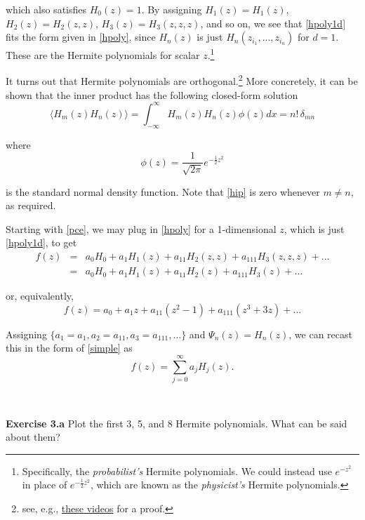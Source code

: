 \documentclass[11pt]{article}
\numberwithin{equation}{section}
\begin{document}
which also satisfies $H_0(z) = 1$. By assigning $H_1(z) = H_1(z)$, $H_2(z) = H_2(z, z)$, $H_3(z) = H_3(z, z, z)$, and so on, we see that \eqref{hpoly1d} fits the form given in \eqref{hpoly}, since $H_n(z)$ is just $H_n (z_{i_1}, ..., z_{i_n})$ for $d = 1$. These are the Hermite polynomials for scalar $z$.\footnote{Specifically, the {\em probabilist's} Hermite polynomials. We could instead use $e^{-z^2}$ in place of $e^{-\frac{1}{2} z^2}$, which are known as the {\em physicist's} Hermite polynomials.}

\qquad It turns out that Hermite polynomials are orthogonal.\footnote{see, e.g., \href{https://www.youtube.com/playlist?list=PL2uXHjNuf12byaQWF2IU7i7h8D70-d8MW}{these videos} for a proof.} More concretely, it can be shown that the inner product has the following closed-form solution
\begin{equation}
\langle H_m(z) H_n(z) \rangle = \int_{-\infty}^{\infty} H_m(z) H_n(z) \phi(z) dx =  n! \, \delta_{mn} \label{hip}
\end{equation}

where
\begin{equation*}
\phi(z) = \frac{1}{\sqrt{2 \pi}}e^{-\frac{1}{2} z^2}
\end{equation*}

is the standard normal density function. Note that \eqref{hip} is zero whenever $m \neq n$, as required.

\qquad Starting with \eqref{pce}, we may plug in \eqref{hpoly} for a 1-dimensional $z$, which is just \eqref{hpoly1d}, to get 
\begin{eqnarray}
f(z) & = & a_0 H_0 + a_1 H_1(z)  + a_{11} H_2(z, z) + a_{111} H_3(z, z, z) + ... \nonumber \\
& = & a_0 H_0 + a_1 H_1(z)  + a_{11} H_2(z) + a_{111} H_3(z) + ...
\end{eqnarray}

or, equivalently,
\begin{equation}
f(z) = a_0 +  a_1 z + a_{11} (z^2 - 1) + a_{111} (z^3 + 3 z) + ...
\end{equation}

Assigning $\{a_1 = a_1, a_2 = a_{11}, a_3 = a_{111}, ...\}$ and $\Psi_n(z) = H_n(z)$, we can recast this in the form of \eqref{simple} as
\begin{equation}
f(z) = \sum_{j=0}^{\infty} a_j H_j(z).
\end{equation}


\

\textbf{Exercise 3.a} Plot the first 3, 5, and 8 Hermite polynomials. What can be said about them?
\end{document}
